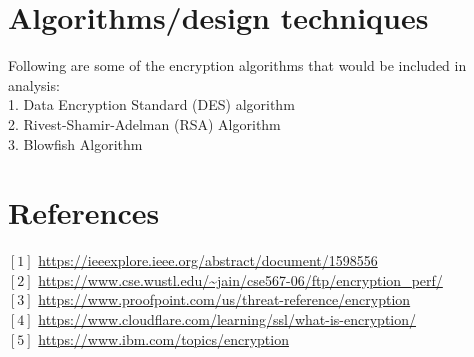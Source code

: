 \documentclass[a4paper]{article}
\begin{document}
\newpage 
\section{Algorithms/design techniques} %
Following are some of the encryption algorithms that would be included in analysis: \\
1. Data Encryption Standard (DES) algorithm\\ 
2. Rivest-Shamir-Adelman (RSA) Algorithm \\
3. Blowfish Algorithm \\


\section{References}
$[1]$ \url{https://ieeexplore.ieee.org/abstract/document/1598556}\\
$[2]$ \url{https://www.cse.wustl.edu/~jain/cse567-06/ftp/encryption_perf/}\\
$[3]$ \url{https://www.proofpoint.com/us/threat-reference/encryption}\\
$[4]$ \url{https://www.cloudflare.com/learning/ssl/what-is-encryption/}\\
$[5]$ \url{https://www.ibm.com/topics/encryption}\\ 
\end{document}
